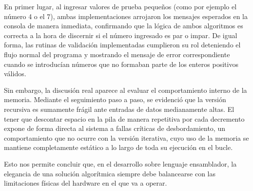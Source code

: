 \documentclass[12pt, a4paper]{article}
\begin{document}
En primer lugar, al ingresar valores de prueba pequeños (como por ejemplo el número 4 o el 7), ambas implementaciones arrojaron los mensajes esperados en la consola de manera inmediata, confirmando que la lógica de ambos algoritmos es correcta a la hora de discernir si el número ingresado es par o impar. De igual forma, las rutinas de validación implementadas cumplieron su rol deteniendo el flujo normal del programa y mostrando el mensaje de error correspondiente cuando se introducían números que no formaban parte de los enteros positivos válidos.

Sin embargo, la discusión real aparece al evaluar el comportamiento interno de la memoria. Mediante el seguimiento paso a paso, se evidenció que la versión recursiva es sumamente frágil ante entradas de datos medianamente altas. El tener que descontar espacio en la pila de manera repetitiva por cada decremento expone de forma directa al sistema a fallas críticas de desbordamiento, un comportamiento que no ocurre con la versión iterativa, cuyo uso de la memoria se mantiene completamente estático a lo largo de toda su ejecución en el bucle.

Esto nos permite concluir que, en el desarrollo sobre lenguaje ensamblador, la elegancia de una solución algorítmica siempre debe balancearse con las limitaciones físicas del hardware en el que va a operar.
\end{document}
